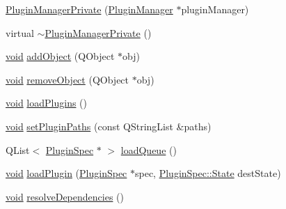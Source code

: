 \begin{DoxyCompactItemize}
\item 
\hyperlink{class_extension_system_1_1_internal_1_1_plugin_manager_private_aa9b980c8b4d4f99bc52edcd02c22a933}{\-Plugin\-Manager\-Private} (\hyperlink{class_extension_system_1_1_plugin_manager}{\-Plugin\-Manager} $\ast$plugin\-Manager)
\item 
virtual \hyperlink{class_extension_system_1_1_internal_1_1_plugin_manager_private_a434ba94470f7507ea1c65b6b7f7b58a8}{$\sim$\-Plugin\-Manager\-Private} ()
\item 
\hyperlink{group___u_a_v_objects_plugin_ga444cf2ff3f0ecbe028adce838d373f5c}{void} \hyperlink{class_extension_system_1_1_internal_1_1_plugin_manager_private_a4d9a60e36e831bdafbe905ae247b3cf3}{add\-Object} (\-Q\-Object $\ast$obj)
\item 
\hyperlink{group___u_a_v_objects_plugin_ga444cf2ff3f0ecbe028adce838d373f5c}{void} \hyperlink{class_extension_system_1_1_internal_1_1_plugin_manager_private_abc89590fec7337cbde0b99711da09329}{remove\-Object} (\-Q\-Object $\ast$obj)
\item 
\hyperlink{group___u_a_v_objects_plugin_ga444cf2ff3f0ecbe028adce838d373f5c}{void} \hyperlink{class_extension_system_1_1_internal_1_1_plugin_manager_private_a5097be47257a455a1c7347b67982b600}{load\-Plugins} ()
\item 
\hyperlink{group___u_a_v_objects_plugin_ga444cf2ff3f0ecbe028adce838d373f5c}{void} \hyperlink{class_extension_system_1_1_internal_1_1_plugin_manager_private_a38c08e6dbab3c28d6b00dac7e1e6f976}{set\-Plugin\-Paths} (const \-Q\-String\-List \&paths)
\item 
\-Q\-List$<$ \hyperlink{class_extension_system_1_1_plugin_spec}{\-Plugin\-Spec} $\ast$ $>$ \hyperlink{class_extension_system_1_1_internal_1_1_plugin_manager_private_a9317db01cb0daa7ca5c3d2629af8c2b3}{load\-Queue} ()
\item 
\hyperlink{group___u_a_v_objects_plugin_ga444cf2ff3f0ecbe028adce838d373f5c}{void} \hyperlink{class_extension_system_1_1_internal_1_1_plugin_manager_private_a9da5a8705edf11abe810d001af6af5e6}{load\-Plugin} (\hyperlink{class_extension_system_1_1_plugin_spec}{\-Plugin\-Spec} $\ast$spec, \hyperlink{class_extension_system_1_1_plugin_spec_a3d40e1bd1f17eb32b314bcd282b3e3b9}{\-Plugin\-Spec\-::\-State} dest\-State)
\item 
\hyperlink{group___u_a_v_objects_plugin_ga444cf2ff3f0ecbe028adce838d373f5c}{void} \hyperlink{class_extension_system_1_1_internal_1_1_plugin_manager_private_aeafdcf8c4ecb2d7311ce9d2e9246e664}{resolve\-Dependencies} ()

\end{DoxyCompactItemize}
